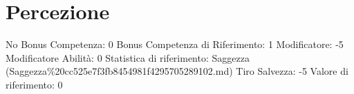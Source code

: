 \section{Percezione}\label{percezione}

\begin{description}
\tightlist
\item[Tags: ABI]
No Bonus Competenza: 0 Bonus Competenza di Riferimento: 1 Modificatore:
-5 Modificatore Abilità: 0 Statistica di riferimento: Saggezza
(Saggezza\%20cc525e7f3fb8454981f4295705289102.md) Tiro Salvezza: -5
Valore di riferimento: 0
\end{description}
